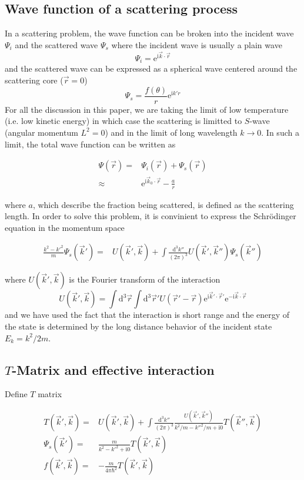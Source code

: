 \documentclass[aps,twocolumn,secnumarabic,balancelastpage,amsmath,amssymb,nofootinbib]{revtex4}
\newcommand{\ud}{\mathrm{d}}
\newcommand{\ue}{\mathrm{e}}
\newcommand{\ui}{\mathrm{i}}
\newcommand{\eqar}[1]
{
  \begin{align*}
    #1
  \end{align*}
}
\newcommand{\paren}[1]{{\left({#1}\right)}}
\begin{document}
\subsection{Wave function of a scattering process}
In a scattering problem, the wave function can be broken into the incident wave $\Psi_i$ and the scattered wave $\Psi_s$ where the incident wave is usually a plain wave
\[\Psi_i=\ue^{\ui\vec k\cdot\vec r}\]
and the scattered wave can be expressed as a spherical wave centered around the scattering core ($\vec r=0$)
\[\Psi_s=\frac{f\paren{\theta}}{r}\ue^{\ui k'r}\]
For all the discussion in this paper, we are taking the limit of low temperature (i.e. low kinetic energy) in which case the scattering is limitted to $S$-wave (angular momentum $L^2=0$) and in the limit of long wavelength $k\rightarrow0$. In such a limit, the total wave function can be written as
\eqar{
  \Psi\paren{\vec r}=&\Psi_i\paren{\vec r}+\Psi_s\paren{\vec r}\\
  \approx&\ue^{\ui \vec k_0\cdot \vec r}-\frac{a}{r}
}
where $a$, which describe the fraction being scattered, is defined as the scattering length. In order to solve this problem, it is convinient to express the Schr\"odinger equation in the momentum space
\eqar{
  \frac{k^2-k'^2}{m}\Psi_{s}\paren{\vec k'}=&U\paren{\vec k', \vec k}+\int\frac{\ud^3 k''}{\paren{2\pi}^3}U\paren{\vec k', \vec k''}\Psi_s\paren{\vec k''}
}
where $U\paren{\vec k', \vec k}$ is the Fourier transform of the interaction
\[ U(\vec k', \vec k)=\int\ud^3\vec r\int\ud^3\vec r'U\paren{\vec r'-\vec r}\ue^{\ui\vec k'\cdot\vec r'}\ue^{-\ui\vec k\cdot\vec r}\]
and we have used the fact that the interaction is short range and the energy of the state is determined by the long distance behavior of the incident state $E_k=k^2/2m$.

\subsection{$T$-Matrix and effective interaction}

Define $T$ matrix
\eqar{
  T\paren{\vec k', \vec k}=&U\paren{\vec k', \vec k}+\int\frac{\ud^3k''}{\paren{2\pi}^3}\frac{U\paren{\vec k', \vec k''}}{k^2/m-k''^2/m+\ui 0}T\paren{\vec k'', \vec k}\\
  \Psi_s\paren{\vec k'}=&\frac{m}{k^2-k'^2+\ui 0}T\paren{\vec k', \vec k}\\
  f\paren{\vec k', \vec k}=&-\frac{m}{4\pi\hbar^2}T\paren{\vec k', \vec k}
}
\end{document}
